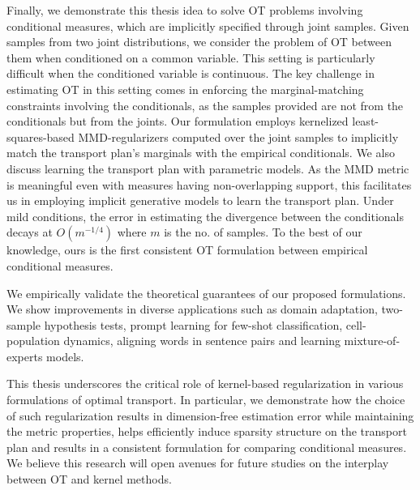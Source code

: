 {Finally, we demonstrate this thesis idea to solve OT problems involving conditional measures, which are implicitly specified through joint samples. 
Given samples from two joint distributions, we consider the problem of OT between them when conditioned on a common variable. 
This setting is particularly difficult when the conditioned variable is continuous. The key challenge in estimating OT in this setting comes in enforcing the marginal-matching constraints involving the conditionals, as the samples provided are not from the conditionals but from the joints. Our formulation employs kernelized least-squares-based MMD-regularizers computed over the joint samples to implicitly match the transport plan’s marginals with the empirical conditionals.
We also discuss learning the transport plan with parametric models. As the MMD metric is meaningful even with measures having non-overlapping support, this facilitates us in employing implicit generative models to learn the transport plan. Under mild conditions, the error in estimating the divergence between the conditionals decays at $O(m^{-1/4})$ where $m$ is the no. of samples. To the best of our knowledge, ours is the first consistent OT formulation between empirical conditional measures.

We empirically validate the theoretical guarantees of our proposed formulations. We show improvements in diverse applications such as domain adaptation, two-sample hypothesis tests, prompt learning for few-shot classification, cell-population dynamics, aligning words in sentence pairs and learning mixture-of-experts models.

This thesis underscores the critical role of kernel-based regularization in various formulations of optimal transport. In particular, we demonstrate how the choice of such regularization results in dimension-free estimation error while maintaining the metric properties, helps efficiently induce sparsity structure on the transport plan and results in a consistent formulation for comparing conditional measures. We believe this research will open avenues for future studies on the interplay between OT and kernel methods.
}
